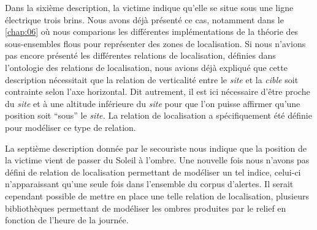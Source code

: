 Dans la sixième description, la victime indique qu'elle se situe sous
une ligne électrique trois brins. Nous avons déjà présenté ce cas,
notamment dans le \autoref{chap:06} où nous comparions les différentes
implémentations de la théorie des sous-ensembles flous pour
représenter des zones de localisation. Si nous n'avions pas encore
présenté les différentes relations de localisation, définies dans
l'ontologie des relations de localisation, nous avions déjà expliqué
que cette description nécessitait que la relation de verticalité entre
le \emph{site} et la \emph{cible} soit contrainte selon l'axe
horizontal. Dit autrement, il est ici nécessaire d'être proche du
\emph{site} et à une altitude inférieure du \emph{site} pour que l'on
puisse affirmer qu'une position soit \enquote{sous} le \emph{site.}
La relation de localisation  a spécifiquement
été définie pour modéliser ce type de relation.

La septième description donnée par le secouriste nous indique que la
position de la victime vient de passer du Soleil à l'ombre. Une
nouvelle fois nous n'avons pas défini de relation de localisation
permettant de modéliser un tel indice, celui-ci n'apparaissant qu'une
seule fois dans l'ensemble du corpus d'alertes. Il serait cependant
possible de mettre en place une telle relation de localisation,
plusieurs bibliothèques permettant de modéliser les ombres produites
par le relief en fonction de l'heure de la journée.

